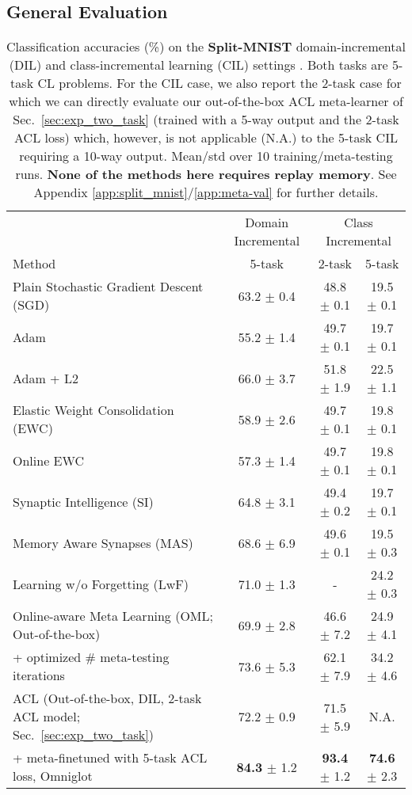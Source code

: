 \documentclass{article}
\begin{document}
\subsection{General Evaluation}
\label{sec:more_tasks}
\begin{table}[t]
\small
\setlength{\tabcolsep}{0.3em}
\caption{Classification accuracies (\%) on the \textbf{Split-MNIST} domain-incremental (DIL) and class-incremental learning (CIL) settings \citep{hsu2018re}. Both tasks are 5-task CL problems. For the CIL case, we also report the 2-task case for which we can directly evaluate our out-of-the-box ACL meta-learner of Sec.~\ref{sec:exp_two_task} (trained with a 5-way output and the 2-task ACL loss) which, however, is not applicable (N.A.) to the 5-task CIL requiring a 10-way output. Mean/std over 10 training/meta-testing runs. \textbf{None of the methods here requires replay memory}. See Appendix \ref{app:split_mnist}/\ref{app:meta-val} for further details.}
\vspace{-2mm}
\label{tab:split_mnist}
\begin{center}
\begin{tabular}{lccc}
\toprule
 & Domain Incremental & \multicolumn{2}{c}{Class Incremental} \\ \cmidrule(lr){2-2} \cmidrule(lr){3-4}
Method & \multicolumn{1}{c}{5-task} & 2-task & 5-task \\ \midrule 
Plain Stochastic Gradient Descent (SGD) & 63.2 $\pm$  0.4 & 48.8 $\pm$ 0.1 & 19.5 $\pm$ 0.1 \\
Adam & 55.2 $\pm$  1.4 & 49.7 $\pm$ 0.1 & 19.7 $\pm$ 0.1 \\   \midrule 
Adam + L2 &  66.0 $\pm$ 3.7 & 51.8 $\pm$ 1.9  & 22.5 $\pm$  1.1 \\
Elastic Weight Consolidation (EWC) & 58.9 $\pm$  2.6 & 49.7 $\pm$ 0.1  &  19.8 $\pm$ 0.1 \\  
Online EWC & 57.3 $\pm$ 1.4 & 49.7 $\pm$ 0.1 & 19.8 $\pm$ 0.1 \\  
Synaptic Intelligence (SI) & 64.8 $\pm$ 3.1 & 49.4 $\pm$ 0.2 & 19.7 $\pm$ 0.1 \\ 
Memory Aware Synapses (MAS) & 68.6 $\pm$ 6.9 &  49.6 $\pm$ 0.1 & 19.5 $\pm$ 0.3 \\ 
Learning w/o Forgetting (LwF) & 71.0 $\pm$ 1.3 & - & 24.2 $\pm$ 0.3 \\  \midrule 
Online-aware Meta Learning (OML; Out-of-the-box) & 69.9 $\pm$ 2.8 & 46.6 $\pm$ 7.2 & 24.9 $\pm$ 4.1 \\ 
\quad + optimized \# meta-testing iterations & 73.6 $\pm$ 5.3 & 62.1 $\pm$ 7.9 & 34.2 $\pm$ 4.6 \\ 
\midrule \midrule 
ACL (Out-of-the-box, DIL, 2-task ACL model; Sec.~\ref{sec:exp_two_task}) & 72.2 $\pm$ 0.9 & 71.5 $\pm$ 5.9 & N.A. \\ 
\quad + meta-finetuned with 5-task ACL loss, Omniglot & \textbf{84.3} $\pm$ 1.2 & \textbf{93.4} $\pm$ 1.2 & \textbf{74.6} $\pm$ 2.3 \\ 
\bottomrule
\end{tabular}
\end{center}
\vspace{-5mm}

\end{table}
\end{document}
